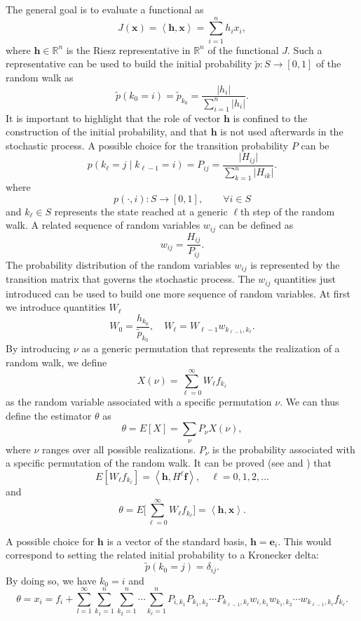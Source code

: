 \documentclass[final,leqno,onefignum,onetabnum]{siamltex1213}
\begin{document}
The general goal is to evaluate a functional as
\[
J(\mathbf{x})=\left \langle\mathbf{h},\mathbf{x}\right\rangle=\sum_{i=1}^n h_i
x_i,
\]
where $\mathbf{h}\in \mathbb{R}^n$ is the Riesz representative in
$\mathbb{R}^n$ of the functional $J$.
Such a representative can be used to build the initial probability
$\tilde{p}:
S\rightarrow [0,1]$ of the random walk as
\[
\tilde{p}(k_0=i)=\tilde{p}_{k_0}=\frac{\lvert h_i\rvert}{\sum_{i=1}^n
\lvert h_i\rvert}.
\]
It is important to highlight that the role of vector $\mathbf{h}$ is
confined to the construction of the initial probability, and that $\mathbf{h}$
is not
used afterwards in the stochastic process.
A possible choice for the transition probability $P$ can be
\[
p(k_{\ell}=j \;\lvert\;k_{\ell-1}=i )=P_{ij}=\frac{\lvert
H_{ij}\rvert}{\sum_{k=1}^n
\lvert H_{ik}\rvert}.
\]
where
\[
p(\cdot,i):S\rightarrow [0,1], \qquad \forall i\in S
\]
and $k_{\ell}\in S$
represents the state reached at a generic $\ell$th step of the random walk.
A related sequence of random variables $w_{ij}$ can be defined
as
\[
w_{ij}=\frac{H_{ij}}{P_{ij}}.
\]
The probability distribution of the random variables $w_{ij}$ is represented
by the transition matrix that governs the stochastic process. The $w_{ij}$
quantities just introduced can be used to build one more sequence
of random variables.
At first we introduce quantities $W_\ell$
\[
W_{0}=\frac{h_{k_0}}{\tilde{p}_{k_0}}, \quad W_{\ell}=W_{\ell-1}
w_{k_{\ell-1},k_{\ell}}.
\]
By introducing $\nu$ as a generic permutation that represents the realization
of a random walk, we define
\[
X(\nu)=\sum_{\ell=0}^\infty W_{\ell} f_{k_{\ell}}
\]
as the random variable associated with a specific permutation $\nu$.
We can thus
define the estimator $\theta$ as
\[
\theta=E[X]=\sum_{\nu}P_{\nu}X(\nu),
\]
where $\nu$ ranges over all possible realizations.
$P_{\nu}$ is the probability associated with a specific permutation of the
random walk.
It can be proved (see \cite{Hal1962} and \cite{Hal1994}) that
\[
E[W_{\ell}
f_{k_{\ell}}]=\left\langle\mathbf{h},H^{\ell}\mathbf{f}\right\rangle, \quad
\ell=0,1,2,\ldots
\]
and
\[
\theta=E\bigg[\sum_{\ell=0}^\infty W_{\ell}
f_{k_{\ell}}\bigg]=\left\langle\mathbf{h},\mathbf{x}\right\rangle.
\]

A possible choice for $\mathbf{h}$ is a vector of the standard basis,
$\mathbf{h} = \mathbf{e}_i$. This
would correspond to setting the related initial probability to a Kronecker
delta:
\[
\tilde{p}(k_0=j)=\delta_{ij}.
\]
By doing so, we have $k_0 = i$ and
\begin{equation}
\theta = x_i=
f_i + \sum_{l=1}^\infty
\sum_{k_1=1}^{n}\sum_{k_2=1}^n\cdots \sum_{k_{\ell}=1}^n
P_{i,k_1}P_{k_1,k_2}\cdots P_{k_{\ell-1},
k_{\ell}}w_{i,k_1}w_{k_1,k_2}\cdots
w_{k_{\ell-1}, k_{\ell}}f_{k_{\ell}}.
\label{dir_mean}
\end{equation}
\end{document}

